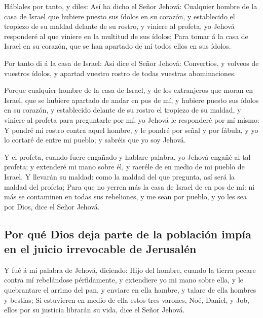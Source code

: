  Háblales por tanto, y diles: Así ha dicho el Señor Jehová:
Cualquier hombre de la casa de Israel que hubiere puesto sus ídolos en
su corazón, y establecido el tropiezo de su maldad delante de su rostro,
y viniere al profeta, yo Jehová responderé al que viniere en la multitud
de sus ídolos;  Para tomar á la casa de Israel en su
corazón, que se han apartado de mí todos ellos en sus ídolos.

 Por tanto di á la casa de Israel: Así dice el Señor Jehová:
Convertíos, y volveos de vuestros ídolos, y apartad vuestro rostro de
todas vuestras abominaciones.

 Porque cualquier hombre de la casa de Israel, y de los
extranjeros que moran en Israel, que se hubiere apartado de andar en pos
de mí, y hubiere puesto sus ídolos en su corazón, y establecido delante
de su rostro el tropiezo de su maldad, y viniere al profeta para
preguntarle por mí, yo Jehová le responderé por mí mismo:  Y
pondré mi rostro contra aquel hombre, y le pondré por señal y por
fábula, y yo lo cortaré de entre mi pueblo; y sabréis que yo soy Jehová.

 Y el profeta, cuando fuere engañado y hablare palabra, yo
Jehová engañé al tal profeta; y extenderé mi mano sobre él, y raeréle de
en medio de mi pueblo de Israel.  Y llevarán su maldad:
como la maldad del que pregunta, así será la maldad del profeta;
 Para que no yerren más la casa de Israel de en pos de mí:
ni más se contaminen en todas sus rebeliones, y me sean por pueblo, y yo
les sea por Dios, dice el Señor Jehová.

\hypertarget{por-quuxe9-dios-deja-parte-de-la-poblaciuxf3n-impuxeda-en-el-juicio-irrevocable-de-jerusaluxe9n}{%
\subsection{Por qué Dios deja parte de la población impía en el juicio
irrevocable de
Jerusalén}\label{por-quuxe9-dios-deja-parte-de-la-poblaciuxf3n-impuxeda-en-el-juicio-irrevocable-de-jerusaluxe9n}}

 Y fué á mí palabra de Jehová, diciendo:  Hijo
del hombre, cuando la tierra pecare contra mí rebelándose pérfidamente,
y extendiere yo mi mano sobre ella, y le quebrantare el arrimo del pan,
y enviare en ella hambre, y talare de ella hombres y bestias;
 Si estuvieren en medio de ella estos tres varones, Noé,
Daniel, y Job, ellos por su justicia librarán su vida, dice el Señor
Jehová.

